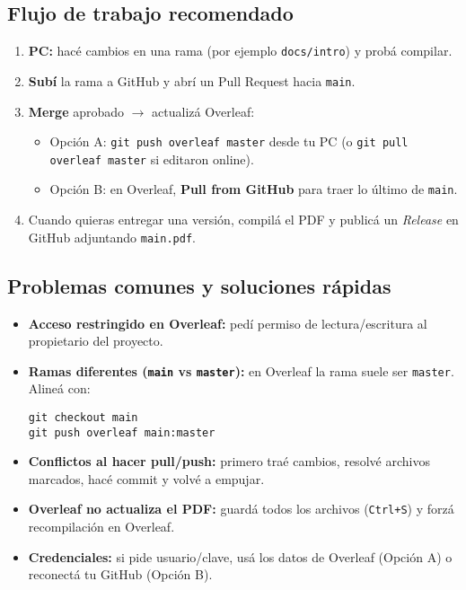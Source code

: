 \subsection*{Flujo de trabajo recomendado}
\begin{enumerate}[leftmargin=1.2em]
  \item \textbf{PC:} hacé cambios en una rama (por ejemplo \texttt{docs/intro}) y probá compilar.
  \item \textbf{Subí} la rama a GitHub y abrí un Pull Request hacia \texttt{main}.
  \item \textbf{Merge} aprobado $\rightarrow$ actualizá Overleaf:
  \begin{itemize}
    \item Opción A: \texttt{git push overleaf master} desde tu PC (o \texttt{git pull overleaf master} si editaron online).
    \item Opción B: en Overleaf, \textbf{Pull from GitHub} para traer lo último de \texttt{main}.
  \end{itemize}
  \item Cuando quieras entregar una versión, compilá el PDF y publicá un \textit{Release} en GitHub adjuntando \texttt{main.pdf}.
\end{enumerate}

\subsection*{Problemas comunes y soluciones rápidas}
\begin{itemize}[leftmargin=1.2em]
  \item \textbf{Acceso restringido en Overleaf:} pedí permiso de lectura/escritura al propietario del proyecto.
  \item \textbf{Ramas diferentes (\texttt{main} vs \texttt{master}):} en Overleaf la rama suele ser \texttt{master}. Alineá con:
\begin{verbatim}
git checkout main
git push overleaf main:master
\end{verbatim}
  \item \textbf{Conflictos al hacer pull/push:} primero traé cambios, resolvé archivos marcados, hacé commit y volvé a empujar.
  \item \textbf{Overleaf no actualiza el PDF:} guardá todos los archivos (\texttt{Ctrl+S}) y forzá recompilación en Overleaf.
  \item \textbf{Credenciales:} si pide usuario/clave, usá los datos de Overleaf (Opción A) o reconectá tu GitHub (Opción B).
\end{itemize}

